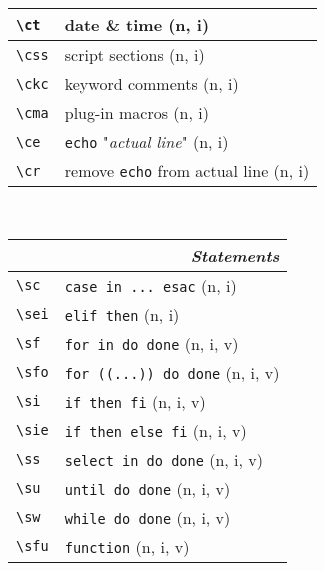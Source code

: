 \documentclass[oneside,11pt,landscape,DIV16]{scrartcl}
\begin{document}
\begin{multicols}{3}
\begin{center}
\begin{tabular}[]{|p{11mm}|p{60mm}|}
\hline     \verb'\ct'   & date \& time                      \hfill (n, i)\\
\hline     \verb'\css'  & script sections                   \hfill (n, i)\\
\hline     \verb'\ckc'  & keyword comments                  \hfill (n, i)\\
\hline     \verb'\cma'  & plug-in macros                    \hfill (n, i)\\
%
\hline     \verb'\ce'   & \texttt{echo} "\textsl{actual line}"  \hfill (n, i)\\
\hline     \verb'\cr'   & remove \texttt{echo} from actual line \hfill (n, i)\\
\hline
\end{tabular}\\
%
\begin{tabular}[]{|p{11mm}|p{60mm}|}
\hline
\multicolumn{2}{|r|}{\textsl{\textbf{S}tatements}}                    \\[1.0ex]
\hline \verb'\sc'  & \verb'case in ... esac'               \hfill (n, i)\\
\hline \verb'\sei' & \verb'elif then'                      \hfill (n, i)\\
\hline \verb'\sf'  & \verb'for in do done'                 \hfill (n, i, v)\\
\hline \verb'\sfo' & \verb'for ((...)) do done'            \hfill (n, i, v)\\
\hline \verb'\si'  & \verb'if then fi'                     \hfill (n, i, v)\\
\hline \verb'\sie' & \verb'if then else fi'                \hfill (n, i, v)\\
\hline \verb'\ss'  & \verb'select in do done'              \hfill (n, i, v)\\
\hline \verb'\su'  & \verb'until do done'                  \hfill (n, i, v)\\
\hline \verb'\sw'  & \verb'while do done'                  \hfill (n, i, v)\\
\hline \verb'\sfu' & \verb'function'                       \hfill (n, i, v)\\

\end{tabular}
\end{center}
\end{multicols}
\end{document}
